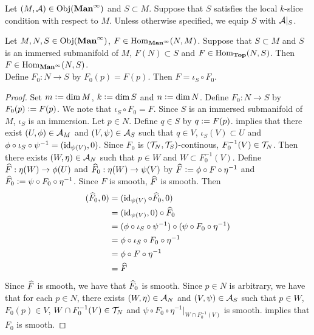 \documentclass{book}
\begin{document}
	\begin{note}
		Let $(M, \mathcal{A}) \in \operatorname{Obj}(\operatorname*{\text{\textbf{Man}}^{\infty}})$ and $S \subset M$. Suppose that $S$ satisfies the local $k$-slice condition with respect to $M$. Unless otherwise specified, we equip $S$ with $\mathcal{A}|_S$.
	\end{note}

	\begin{ex}
		Let $M, N, S \in \operatorname{Obj}(\operatorname*{\text{\textbf{Man}}^{\infty}})$, $F \in \operatorname{Hom}_{\operatorname*{\text{\textbf{Man}}^{\infty}}}(N, M)$. Suppose that $S \subset M$ and $S$ is an immersed submanifold of $M$, $F(N) \subset S$ and $F \in \operatorname{Hom}_{\operatorname*{\text{\textbf{Top}}}}(N, S)$. Then $F \in \operatorname{Hom}_{\operatorname*{\text{\textbf{Man}}^{\infty}}}(N, S)$. \\
		 Define $F_0:N \rightarrow S$ by $F_0(p) = F(p)$. Then $F = \iota_S \circ F_0$.
	\end{ex}

	\begin{proof}
		Set $m \vcentcolon= \dim M$, $k \vcentcolon= \dim S$ and $n \vcentcolon= \dim N$. Define $F_0: N \rightarrow S$ by $F_0(p) \vcentcolon= F(p)$. We note that $\iota_S \circ F_0 = F$. Since $S$ is an immersed submanifold of $M$, $\iota_S$ is an immersion. Let $p \in N$. Define $q \in S$ by $q \vcentcolon= F(p)$.  implies that there exist $(U, \phi) \in \mathcal{A}_M$ and $(V, \psi) \in \mathcal{A}_S$ such that $q \in V$, $\iota_S(V) \subset U$ and $\phi \circ \iota_S \circ \psi^{-1} = (\operatorname{id}_{\psi(V)}, 0)$. Since $F_0$ is $(\mathcal{T}_N, \mathcal{T}_S)$-continous, $F_0^{-1}(V) \in \mathcal{T}_N$. Then there exists $(W, \eta) \in \mathcal{A}_N$ such that $p \in W$ and $W \subset F_0^{-1}(V)$. Define $\widehat{F}: \eta(W) \rightarrow \phi(U)$ and $\widehat{F}_0: \eta(W) \rightarrow \psi(V)$ by $\widehat{F} \vcentcolon= \phi \circ F \circ \eta^{-1}$ and $\widehat{F}_0 \vcentcolon= \psi \circ F_0 \circ \eta^{-1}$. Since $F$ is smooth, $\widehat{F}$ is smooth. Then 
		\begin{align*}
			(\widehat{F}_0, 0)
			& = (\operatorname{id}_{\psi(V)} \circ \widehat{F}_0, 0) \\
			& = (\operatorname{id}_{\psi(V)}, 0) \circ \widehat{F}_0 \\
			& = (\phi \circ \iota_S \circ \psi^{-1}) \circ (\psi \circ F_0 \circ \eta^{-1}) \\
			& = \phi \circ \iota_S \circ F_0 \circ \eta^{-1} \\
			& = \phi \circ F \circ \eta^{-1} \\
			& = \widehat{F} 
		\end{align*}
		Since $\widehat{F}$ is smooth, we have that $\widehat{F}_0$ is smooth. Since $p \in N$ is arbitrary, we have that for each $p \in N$, there exists $(W, \eta) \in \mathcal{A}_N$ and $(V, \psi) \in \mathcal{A}_S$ such that $p \in W$, $F_0(p) \in V$, $W \cap F_0^{-1}(V) \in \mathcal{T}_N$ and $\psi \circ F_0 \circ \eta^{-1}|_{W \cap F_0^{-1}(V)}$ is smooth.  implies that $F_0$ is smooth. 
	\end{proof}
\end{document}
